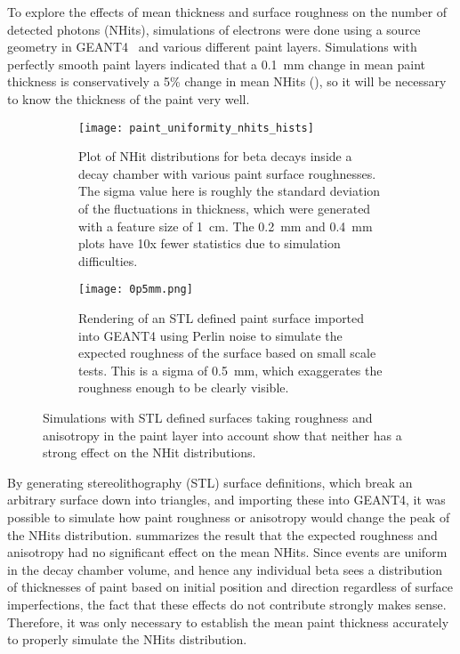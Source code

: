 To explore the effects of mean thickness and surface roughness on the number of detected photons (NHits), simulations of \Li electrons were done using a source geometry in GEANT4~\cite{geant4} and various different paint layers. Simulations with perfectly smooth paint layers indicated that a 0.1~mm change in mean paint thickness is conservatively a 5\% change in mean NHits (), so it will be necessary to know the thickness of the paint very well. 

\begin{figure}
\begin{subfigure}[t]{.53\textwidth}
\texttt{[image: paint\_uniformity\_nhits\_hists]}
\caption{Plot of NHit distributions for \Li beta decays inside a decay chamber with various paint surface roughnesses. The sigma value here is roughly the standard deviation of the fluctuations in thickness, which were generated with a feature size of 1~cm. The 0.2~mm and 0.4~mm plots have 10x fewer statistics due to simulation difficulties.}
\label{fig:simulations}
\end{subfigure}
\hfill
\begin{subfigure}[t]{.42\textwidth}
\centering
\texttt{[image: 0p5mm.png]}
\caption{Rendering of an STL defined paint surface imported into GEANT4 using Perlin noise to simulate the expected roughness of the surface based on small scale tests. This is a sigma of 0.5~mm, which exaggerates the roughness enough to be clearly visible.}
\label{fig:rough_sphere}
\end{subfigure}
\caption{Simulations with STL defined surfaces taking roughness and anisotropy in the paint layer into account show that neither has a strong effect on the NHit distributions.}
\label{fig:stltests}
\end{figure}

By generating stereolithography (STL) surface definitions, which break an arbitrary surface down into triangles, and importing these into GEANT4, it was possible to simulate how paint roughness or anisotropy would change the peak of the NHits distribution. 
 summarizes the result that the expected roughness and anisotropy had no significant effect on the mean NHits. 
Since events are uniform in the decay chamber volume, and hence any individual beta sees a distribution of thicknesses of paint based on initial position and direction regardless of surface imperfections, the fact that these effects do not contribute strongly makes sense. 
Therefore, it was only necessary to establish the mean paint thickness accurately to properly simulate the NHits distribution.

